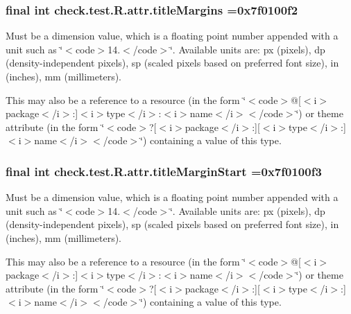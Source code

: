 \subsubsection[{title\+Margins}]{\setlength{\rightskip}{0pt plus 5cm}final int check.\+test.\+R.\+attr.\+title\+Margins =0x7f0100f2\hspace{0.3cm}{\ttfamily [static]}}\label{classcheck_1_1test_1_1_r_1_1attr_a088a77fc6e1f7916d5c036ebebe5ab5c}
Must be a dimension value, which is a floating point number appended with a unit such as \char`\"{}$<$code$>$14.\+5sp$<$/code$>$\char`\"{}. Available units are\+: px (pixels), dp (density-\/independent pixels), sp (scaled pixels based on preferred font size), in (inches), mm (millimeters). 

This may also be a reference to a resource (in the form \char`\"{}$<$code$>$@\mbox{[}$<$i$>$package$<$/i$>$\+:\mbox{]}$<$i$>$type$<$/i$>$\+:$<$i$>$name$<$/i$>$$<$/code$>$\char`\"{}) or theme attribute (in the form \char`\"{}$<$code$>$?\mbox{[}$<$i$>$package$<$/i$>$\+:\mbox{]}\mbox{[}$<$i$>$type$<$/i$>$\+:\mbox{]}$<$i$>$name$<$/i$>$$<$/code$>$\char`\"{}) containing a value of this type. \hypertarget{classcheck_1_1test_1_1_r_1_1attr_a09d7811f39e20d8013b4a96d09150900}{}
\subsubsection[{title\+Margin\+Start}]{\setlength{\rightskip}{0pt plus 5cm}final int check.\+test.\+R.\+attr.\+title\+Margin\+Start =0x7f0100f3\hspace{0.3cm}{\ttfamily [static]}}\label{classcheck_1_1test_1_1_r_1_1attr_a09d7811f39e20d8013b4a96d09150900}
Must be a dimension value, which is a floating point number appended with a unit such as \char`\"{}$<$code$>$14.\+5sp$<$/code$>$\char`\"{}. Available units are\+: px (pixels), dp (density-\/independent pixels), sp (scaled pixels based on preferred font size), in (inches), mm (millimeters). 

This may also be a reference to a resource (in the form \char`\"{}$<$code$>$@\mbox{[}$<$i$>$package$<$/i$>$\+:\mbox{]}$<$i$>$type$<$/i$>$\+:$<$i$>$name$<$/i$>$$<$/code$>$\char`\"{}) or theme attribute (in the form \char`\"{}$<$code$>$?\mbox{[}$<$i$>$package$<$/i$>$\+:\mbox{]}\mbox{[}$<$i$>$type$<$/i$>$\+:\mbox{]}$<$i$>$name$<$/i$>$$<$/code$>$\char`\"{}) containing a value of this type. \hypertarget{classcheck_1_1test_1_1_r_1_1attr_ae16b8b538a7ee6adc4c7b58aaefb3b5c}{}
